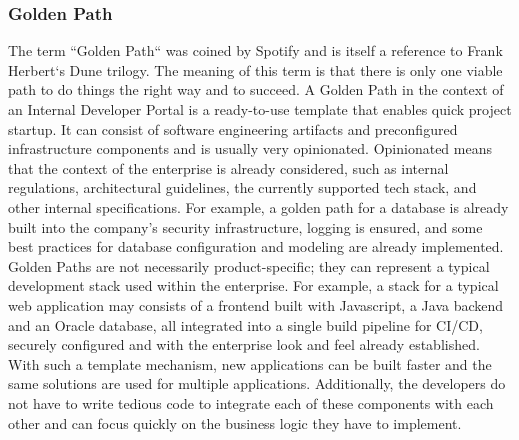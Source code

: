 \documentclass[a4paper,10pt]{article}
\begin{document}
    \subsubsection{Golden Path}
    \label{sssec:goldenpath}
    The term ``Golden Path`` was coined by Spotify\parencite{spotifygoldenpath} and is itself a reference to Frank
    Herbert`s Dune trilogy.
    The meaning of this term is that there is only one viable path to do things the right way and to succeed.
    A Golden Path in the context of an Internal Developer Portal is a ready-to-use template that enables quick project startup.
    It can consist of software engineering artifacts and preconfigured infrastructure components and is usually very
    opinionated.
    Opinionated means that the context of the enterprise is already considered, such as internal regulations,
    architectural guidelines, the currently supported tech stack, and other internal specifications.
    For example, a golden path for a database is already built into the company's security infrastructure,
    logging is ensured, and some best practices for database configuration and modeling are already implemented.\\
    Golden Paths are not necessarily product-specific;
    they can represent a typical development stack used within the enterprise.
    For example, a stack for a typical web application may consists of a frontend built with Javascript, a Java backend
    and an Oracle database, all integrated into a single build pipeline for CI/CD,    securely configured and with
    the enterprise look and feel already established.
    With such a template mechanism, new applications can be built faster and the same solutions are used for multiple
    applications.
    Additionally, the developers do not have to write tedious code to integrate each of these components with each other
    and can focus quickly on the business logic they have to implement.
\end{document}
